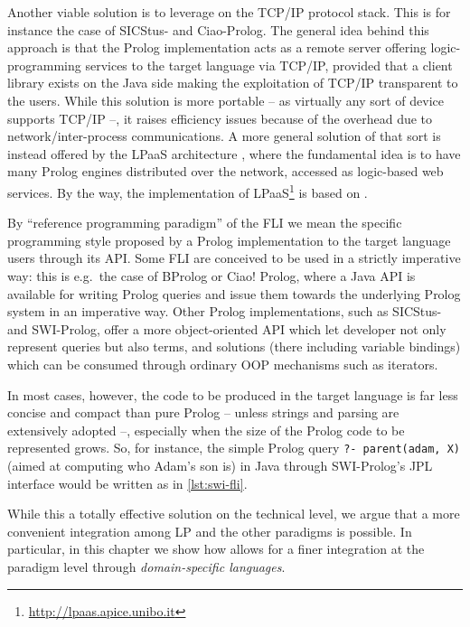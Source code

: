 \documentclass[12pt,a4paper,openright,twoside]{book}
\begin{document}


Another viable solution is to leverage on the TCP/IP protocol stack.
%
This is for instance the case of SICStus- and Ciao-Prolog.
%
The general idea behind this approach is that the Prolog implementation acts as a remote server offering logic-programming services to the target language via TCP/IP, provided that a client library exists on the Java side making the exploitation of TCP/IP transparent to the users.
%
While this solution is more portable -- as virtually any sort of device supports TCP/IP --, it raises efficiency issues because of the overhead due to network/inter-process communications.
%
A more general solution of that sort is instead offered by the LPaaS architecture \cite{lpaas-tplp18}, where the fundamental idea is to have many Prolog engines distributed over the network, accessed as logic-based web services.
%
By the way, the implementation of LPaaS\footnote{\url{http://lpaas.apice.unibo.it}} is based on \tuprolog{}.

By ``reference programming paradigm'' of the FLI we mean the specific programming style proposed by a Prolog implementation to the target language users through its API.
%
Some FLI are conceived to be used in a strictly imperative way: this is e.g.\ the case of BProlog or Ciao! Prolog, where a Java API is available for writing Prolog queries and issue them towards the underlying Prolog system in an imperative way.
%
Other Prolog implementations, such as SICStus- and SWI-Prolog, offer a more object-oriented API which let developer not only represent queries but also terms, and solutions (there including variable bindings) which can be consumed through ordinary OOP mechanisms such as iterators.

In most cases, however, the code to be produced in the target language is far less concise and compact than pure Prolog -- unless strings and parsing are extensively adopted  --, especially when the size of the Prolog code to be represented grows.
%
So, for instance, the simple Prolog query \mbox{\texttt{?- parent(adam, X)}} (aimed at computing who Adam's son is) in Java through SWI-Prolog's JPL interface would be written as in \cref{lst:swi-fli}.
%

%
While this a totally effective solution on the technical level, we argue that a more convenient integration among LP and the other paradigms is possible.
%
In particular, in this chapter we show how \twopkt{} allows for a finer integration at the paradigm level through \emph{domain-specific languages}.
\end{document}
